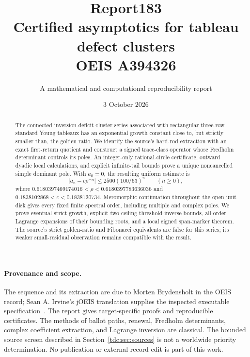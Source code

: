 \documentclass[11pt]{article}
\title{Report183\\[5pt]Certified asymptotics for tableau defect clusters\\[3pt]OEIS A394326}
\author{A mathematical and computational reproducibility report}
\date{3 October 2026}
\theoremstyle{definition}\newtheorem{definition}[theorem]{Definition}
\theoremstyle{remark}\newtheorem{remark}[theorem]{Remark}
\begin{document}
\maketitle
\begin{abstract}
The connected inversion-deficit cluster series associated with rectangular three-row standard Young tableaux has an exponential growth constant close to, but strictly smaller than, the golden ratio. We identify the source's hard-rod extraction with an exact first-return quotient and construct a signed trace-class operator whose Fredholm determinant controls its poles. An integer-only rational-circle certificate, outward dyadic local calculations, and explicit infinite-tail bounds prove a unique noncancelled simple dominant pole. With $a_0=0$, the resulting uniform estimate is
\[
 \left|a_n-c\rho^{-n}\right|\le 2500(100/63)^n\qquad(n\ge0),
\]
where $0.6180397469174016<\rho<0.6180397783636036$ and
$0.1838102868<c<0.1838120734$. Meromorphic continuation throughout the open unit disk gives every fixed finite spectral order, including multiple and complex poles. We prove eventual strict growth, explicit two-ceiling threshold-inverse bounds, all-order Lagrange expansions of their bounding roots, and a local signed span-marker theorem. The source's strict golden-ratio and Fibonacci equivalents are false for this series; its weaker small-residual observation remains compatible with the result.
\end{abstract}

\paragraph{Provenance and scope.}
The sequence and its extraction are due to Morten Brydensholt in the OEIS record; Sean A. Irvine's jOEIS translation supplies the inspected executable specification~\cite{oeis,joeis}. The report gives target-specific proofs and reproducible certificates. The methods of ballot paths, renewal, Fredholm determinants, complex coefficient extraction, and Lagrange inversion are classical. The bounded source screen described in Section~\ref{tdc:sec:sources} is not a worldwide priority determination. No publication or external record edit is part of this work.
\end{document}
